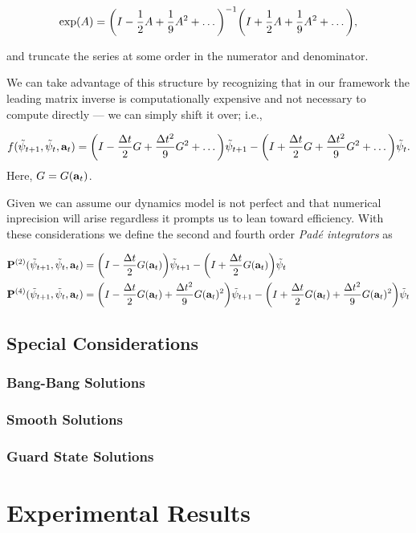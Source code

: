 \documentclass{article}
\newcommand{\isopsi}{\tilde \psi}
\begin{document}
\begin{equation}
  \exp(A) = \qty(I - \frac{1}{2} A + \frac{1}{9} A^2 + \dots)^{-1} \qty(I + \frac{1}{2} A + \frac{1}{9} A^2 + \dots),
\end{equation}

\noindent
and truncate the series at some order in the numerator and denominator.  

We can take advantage of this structure by recognizing that in our framework the leading matrix inverse is computationally expensive and not necessary to compute directly --- we can simply shift it over; i.e.,

\begin{equation}
  f(\isopsi_{t+1}, \isopsi_t, \vb{a}_t) = \qty(I - \frac{\Delta t}{2} G + \frac{\Delta t^2}{9} G^2 + \dots) \isopsi_{t+1} - \qty(I + \frac{\Delta t}{2} G + \frac{\Delta t^2}{9} G^2 + \dots) \isopsi_t.
\end{equation}
\noindent
Here, $G = G(\vb{a}_t)$.

Given we can assume our dynamics model is not perfect and that numerical inprecision will arise regardless it prompts us to lean toward efficiency. With these considerations we define the second and fourth order \textit{Pad\'e integrators} as 

\begin{align}
  \vb{P}^{(2)}(\isopsi_{t+1}, \isopsi_t, \vb{a}_t) &= \qty(I - \frac{\Delta t}{2} G(\vb{a}_t) ) \isopsi_{t+1} - \qty(I + \frac{\Delta t}{2} G(\vb{a}_t) ) \isopsi_t \\
  \vb{P}^{(4)}(\isopsi_{t+1}, \isopsi_t, \vb{a}_t) &= \qty(I - \frac{\Delta t}{2} G(\vb{a}_t)  + \frac{\Delta t^2}{9} G(\vb{a}_t) ^2) \isopsi_{t+1} - \qty(I + \frac{\Delta t}{2} G(\vb{a}_t)  + \frac{\Delta t^2}{9} G(\vb{a}_t) ^2) \isopsi_t
\end{align}


\subsection{Special Considerations}

\subsubsection*{Bang-Bang Solutions}

\subsubsection*{Smooth Solutions}

\subsubsection*{Guard State Solutions}


\newpage
\section{Experimental Results}
\end{document}
